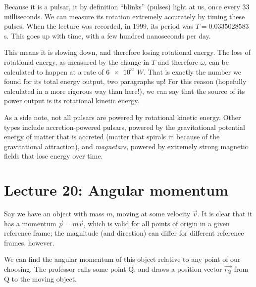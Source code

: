 Because it is a pulsar, it by definition ``blinks'' (pulses) light at us, once every 33 milliseconds. We can measure its rotation extremely accurately by timing these pulses. When the lecture was recorded, in 1999, its period was $T = 0.0335028583$ s. This goes up with time, with a few hundred nanoseconds per day.

This means it is slowing down, and therefore losing rotational energy. The loss of rotational energy, as measured by the change in $T$ and therefore $\omega$, can be calculated to happen at a rate of $\SI{6e31}{W}$. That is exactly the number we found for its total energy output, two paragraphs up! For this reason (hopefully calculated in a more rigorous way than here!), we can say that the source of its power output is its rotational kinetic energy.

As a side note, not all pulsars are powered by rotational kinetic energy. Other types include accretion-powered pulsars, powered by the gravitational potential energy of matter that is accreted (matter that spirals in because of the gravitational attraction), and \emph{magnetars}, powered by extremely strong magnetic fields that lose energy over time.

\section{Lecture 20: Angular momentum}

Say we have an object with mass $m$, moving at some velocity $\vec{v}$. It is clear that it has a momentum $\vec{p} = m \vec{v}$, which is valid for all points of origin in a given reference frame; the magnitude (and direction) can differ for different reference frames, however.

We can find the angular momentum of this object relative to any point of our choosing. The professor calls some point Q, and draws a position vector $\vec{r_Q}$ from Q to the moving object.

\begin{figure}[H]
  \centering
{}
\end{figure}


